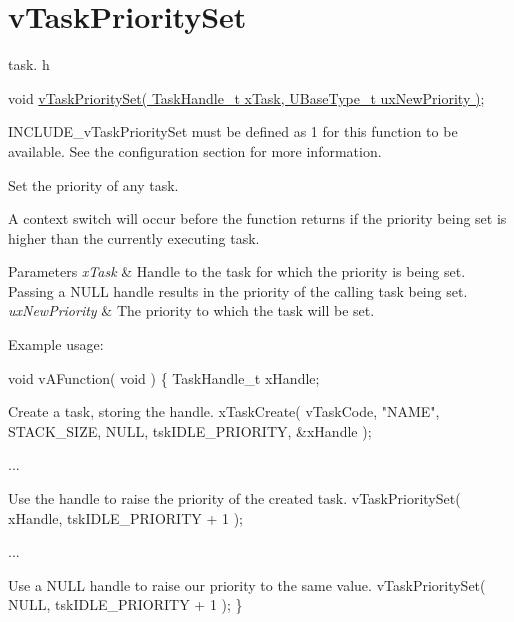 \hypertarget{group__vTaskPrioritySet}{\section{v\-Task\-Priority\-Set}
\label{group__vTaskPrioritySet}
}
task. h 
\begin{DoxyPre}void \hyperlink{task_8h_a1ee31be76e326e0644dbd6ac40a787b6}{vTaskPrioritySet( TaskHandle\_t xTask, UBaseType\_t uxNewPriority )};\end{DoxyPre}


I\-N\-C\-L\-U\-D\-E\-\_\-v\-Task\-Priority\-Set must be defined as 1 for this function to be available. See the configuration section for more information.

Set the priority of any task.

A context switch will occur before the function returns if the priority being set is higher than the currently executing task.


\begin{DoxyParams}{Parameters}
{\em x\-Task} & Handle to the task for which the priority is being set. Passing a N\-U\-L\-L handle results in the priority of the calling task being set.\\
\hline
{\em ux\-New\-Priority} & The priority to which the task will be set.\\
\hline
\end{DoxyParams}
Example usage\-: 
\begin{DoxyPre}
 void vAFunction( void )
 \{
 TaskHandle\_t xHandle;\end{DoxyPre}



\begin{DoxyPre}Create a task, storing the handle.
     xTaskCreate( vTaskCode, "NAME", STACK\_SIZE, NULL, tskIDLE\_PRIORITY, \&xHandle );\end{DoxyPre}



\begin{DoxyPre}...\end{DoxyPre}



\begin{DoxyPre}Use the handle to raise the priority of the created task.
     vTaskPrioritySet( xHandle, tskIDLE\_PRIORITY + 1 );\end{DoxyPre}



\begin{DoxyPre}...\end{DoxyPre}



\begin{DoxyPre}Use a NULL handle to raise our priority to the same value.
     vTaskPrioritySet( NULL, tskIDLE\_PRIORITY + 1 );
 \}
   \end{DoxyPre}
 